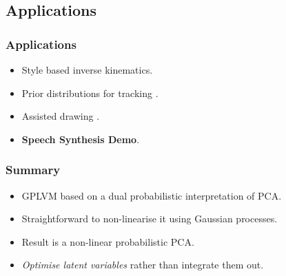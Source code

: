 \subsection{Applications}

\begin{frame}
  \frametitle{Applications}
  \begin{itemize}
  \item Style based inverse kinematics{\footnotesize \citep{Grochow:styleik04}.}
  \item Prior distributions for tracking {\footnotesize \citep{Urtasun:3dpeople06,Urtasun:priors05}.}
  \item Assisted drawing {\footnotesize \citep{Baxter:doodle06}.}
    \item \textbf{Speech Synthesis Demo}.
  \end{itemize}

\end{frame}


\begin{frame}
  \frametitle{Summary}
  \begin{itemize}
  \item GPLVM based on a dual probabilistic interpretation of PCA.
  \item Straightforward to non-linearise it using Gaussian processes.
  \item Result is a non-linear probabilistic PCA.
  \item \emph{Optimise latent variables} rather than integrate them out.
  \end{itemize}
\end{frame}
